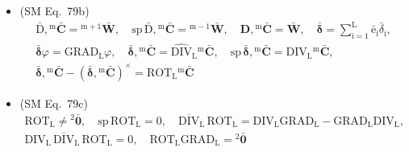 \documentclass[12pt]{article}
\begin{document}
\begin{itemize}[label={},leftmargin=0pt]
    \item (SM Eq.\ 79b) 
    \[
    \begin{gathered}
    \bar{\mathrm{D}}, {}^\mathrm{m}\bar{\mathbf{C}} = {}^{\mathrm{m}+1}\bar{\mathbf{W}}, \quad \mathrm{sp}\,\bar{\mathrm{D}}, {}^\mathrm{m}\bar{\mathbf{C}} = {}^{\mathrm{m}-1}\bar{\mathbf{W}}, \quad \mathbf{D}, {}^\mathrm{m}\bar{\mathbf{C}} = \bar{\mathbf{W}}, \quad \bar{\bm{\delta}} = \sum_{\mathrm{i}=1}^\mathrm{L} \bar{\mathrm{e}}_\mathrm{i} \bar{\delta}_\mathrm{i}, \\
    \bar{\bm{\delta}}\varphi = \mathrm{GRAD}_\mathrm{L} \varphi, \quad \bar{\bm{\delta}}, {}^\mathrm{m}\bar{\mathbf{C}} = \widehat{\mathrm{DIV}}_\mathrm{L} {}^\mathrm{m}\bar{\mathbf{C}}, \quad \mathrm{sp}\,\bar{\bm{\delta}}, {}^\mathrm{m}\bar{\mathbf{C}} = \mathrm{DIV}_\mathrm{L} {}^\mathrm{m}\bar{\mathbf{C}}, \\
    \bar{\bm{\delta}}, {}^\mathrm{m}\bar{\mathbf{C}} - (\bar{\bm{\delta}}, {}^\mathrm{m}\bar{\mathbf{C}})^\times = \mathrm{ROT}_\mathrm{L} {}^\mathrm{m}\bar{\mathbf{C}}
    \end{gathered}
    \]

    \item (SM Eq.\ 79c) 
    \[
    \begin{gathered}
    \mathrm{ROT}_\mathrm{L} \ne {}^2\bar{\mathbf{0}}, \quad \mathrm{sp}\,\mathrm{ROT}_\mathrm{L} = 0, \quad \overline{\mathrm{DIV}}_\mathrm{L}\, \mathrm{ROT}_\mathrm{L} = \mathrm{DIV}_\mathrm{L} \mathrm{GRAD}_\mathrm{L} - \mathrm{GRAD}_\mathrm{L} \mathrm{DIV}_\mathrm{L}, \\
    \mathrm{DIV}_\mathrm{L}\, \overline{\mathrm{DIV}}_\mathrm{L}\, \mathrm{ROT}_\mathrm{L} = 0, \quad \mathrm{ROT}_\mathrm{L} \mathrm{GRAD}_\mathrm{L} = {}^2\bar{\mathbf{0}}
    \end{gathered}
    \]


\end{itemize}
\end{document}
